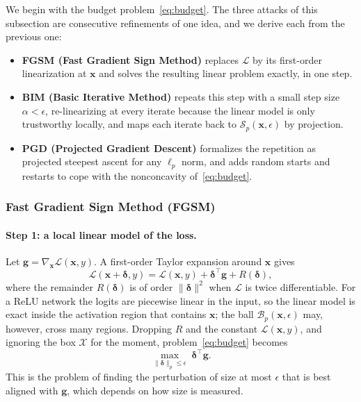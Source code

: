 \documentclass[10pt,a4paper]{extarticle}
\theoremstyle{definition}
\newcommand{\X}{\mathcal{X}}
\newcommand{\Loss}{\mathcal{L}}
\newcommand{\x}{\mathbf{x}}
\newcommand{\bdelta}{\boldsymbol{\delta}}
\newcommand{\B}{\mathcal{B}}
\begin{document}
We begin with the budget problem~\eqref{eq:budget}. The three attacks of this subsection are consecutive refinements of one idea, and we derive each from the previous one:
\begin{itemize}
  \item \textbf{FGSM (Fast Gradient Sign Method)} replaces \(\Loss\) by its first-order linearization at \(\x\) and solves the resulting linear problem exactly, in one step.
  \item \textbf{BIM (Basic Iterative Method)} repeats this step with a small step size \(\alpha<\epsilon\), re-linearizing at every iterate because the linear model is only trustworthy locally, and maps each iterate back to \(\mathcal{S}_p(\x,\epsilon)\) by projection.
  \item \textbf{PGD (Projected Gradient Descent)} formalizes the repetition as projected steepest ascent for any \(\ell_p\) norm, and adds random starts and restarts to cope with the nonconcavity of~\eqref{eq:budget}.
\end{itemize}

\subsubsection{Fast Gradient Sign Method (FGSM)}

\paragraph{Step 1: a local linear model of the loss.} Let \(\mathbf{g}=\nabla_{\x}\Loss(\x,y)\). A first-order Taylor expansion around \(\x\) gives
\begin{equation}\label{eq:lin}
\Loss(\x+\bdelta,y)=\Loss(\x,y)+\bdelta^\top\mathbf{g}+R(\bdelta),
\end{equation}
where the remainder \(R(\bdelta)\) is of order \(\|\bdelta\|^2\) when \(\Loss\) is twice differentiable. For a ReLU network the logits are piecewise linear in the input, so the linear model is exact inside the activation region that contains \(\x\); the ball \(\B_p(\x,\epsilon)\) may, however, cross many regions. Dropping \(R\) and the constant \(\Loss(\x,y)\), and ignoring the box \(\X\) for the moment, problem~\eqref{eq:budget} becomes
\begin{equation}\label{eq:linprob}
\max_{\|\bdelta\|_p\le\epsilon}\;\bdelta^\top\mathbf{g}.
\end{equation}
This is the problem of finding the perturbation of size at most \(\epsilon\) that is best aligned with \(\mathbf{g}\), which depends on how size is measured.
\end{document}
